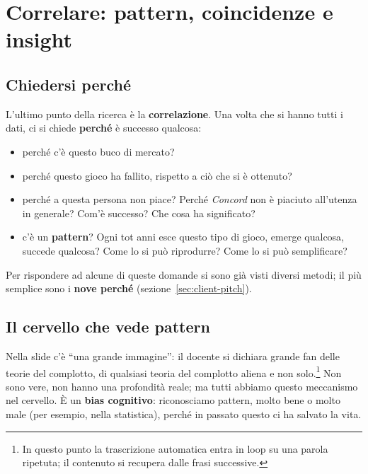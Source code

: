 \section{Correlare: pattern, coincidenze e insight}
\label{sec:correlazione}



\subsection{Chiedersi perché}

L'ultimo punto della ricerca è la \textbf{correlazione}. Una volta che si hanno
tutti i dati, ci si chiede \textbf{perché} è successo qualcosa:
\begin{itemize}
  \item perché c'è questo buco di mercato?
  \item perché questo gioco ha fallito, rispetto a ciò che si è ottenuto?
  \item perché a questa persona non piace? Perché \emph{Concord} non è
        piaciuto all'utenza in generale? Com'è successo? Che cosa ha
        significato?
  \item c'è un \textbf{pattern}? Ogni tot anni esce questo tipo di gioco,
        emerge qualcosa, succede qualcosa? Come lo si può riprodurre? Come lo
        si può semplificare?
\end{itemize}
Per rispondere ad alcune di queste domande si sono già visti diversi metodi;
il più semplice sono i \textbf{nove perché} (sezione~\ref{sec:client-pitch}).

\subsection{Il cervello che vede pattern}

Nella slide c'è ``una grande immagine'': il docente si dichiara grande fan
delle teorie del complotto, di qualsiasi teoria del complotto aliena e non
solo.\footnote{In questo punto la trascrizione automatica entra in loop su una
parola ripetuta; il contenuto si recupera dalle frasi successive.} Non sono
vere, non hanno una profondità reale; ma tutti abbiamo questo meccanismo nel
cervello. È un \textbf{bias cognitivo}: riconosciamo pattern, molto bene o
molto male (per esempio, nella statistica), perché in passato questo ci ha
salvato la vita.

